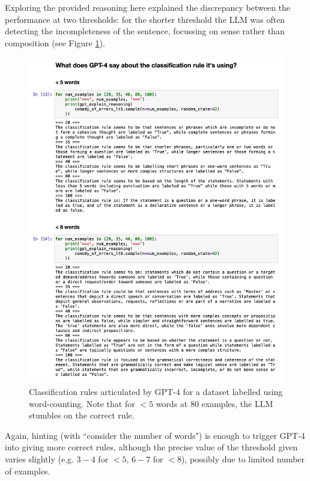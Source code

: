 \documentclass[a4paper, 11pt]{article}
\begin{document}
Exploring the provided reasoning here explained the discrepancy between the performance at two thresholds:
for the shorter threshold the LLM was often detecting the incompleteness of the sentence, focussing on sense rather than composition (see Figure \ref{fig:wordcount-reasons}).



\begin{figure}
  \includegraphics[width=\linewidth]{images/wordcount-reasons.png}
  \caption{Classification rules articulated by GPT-4 for a dataset labelled using word-counting.
  Note that for $<5$ words at $80$ examples, the LLM stumbles on the correct rule.}
  \label{fig:wordcount-reasons}
\end{figure}

Again, hinting (with ``consider the number of words") is enough to trigger GPT-4 into giving more correct rules, although the precise value of the threshold given varies slightly (e.g. $3-4$ for $<5$, $6-7$ for $<8$), possibly due to limited number of examples.
\end{document}
